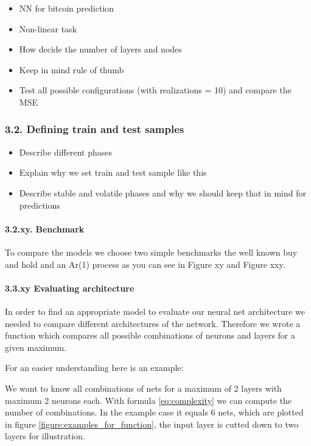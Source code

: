 \documentclass[
]{article}
\providecommand{\tightlist}{%
  \setlength{\itemsep}{0pt}\setlength{\parskip}{0pt}}
\begin{document}
\begin{itemize}
\tightlist
\item
  NN for bitcoin prediction
\item
  Non-linear task
\item
  How decide the number of layers and nodes
\item
  Keep in mind rule of thumb
\item
  Test all possible configurations (with realizations = 10) and compare
  the MSE
\end{itemize}

\hypertarget{defining-train-and-test-samples}{%
\subsubsection{3.2. Defining train and test
samples}\label{defining-train-and-test-samples}}

\begin{itemize}
\item
  Describe different phases
\item
  Explain why we set train and test sample like this
\item
  Describe stable and volatile phases and why we should keep that in
  mind for predictions
\end{itemize}

\hypertarget{xy.-benchmark}{%
\paragraph{3.2.xy. Benchmark}\label{xy.-benchmark}}

To compare the models we choose two simple benchmarks the well known buy
and hold and an Ar(1) process as you can see in Figure xy and Figure
xxy.

\hypertarget{xy-evaluating-architecture}{%
\paragraph{3.3.xy Evaluating
architecture}\label{xy-evaluating-architecture}}

In order to find an appropriate model to evaluate our neural net
architecture we needed to compare different architectures of the
network. Therefore we wrote a function which compares all possible
combinations of neurons and layers for a given maximum.

For an easier understanding here is an example:

We want to know all combinations of nets for a maximum of 2 layers with
maximum 2 neurons each. With formula \ref{eq:complexity} we can compute
the number of combinations. In the example case it equals 6 nets, which
are plotted in figure \ref{figure:examples_for_function}, the input
layer is cutted down to two layers for illustration.
\end{document}
